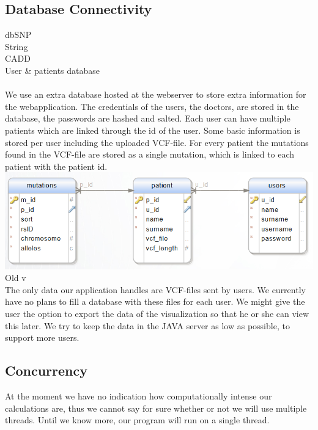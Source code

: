 	\subsection{Database Connectivity}
		dbSNP\\
		String\\
		CADD\\
		User \& patients database\\\\
		We use an extra database hosted at the webserver to store extra information for the webapplication. 
		The credentials of the users, the doctors, are stored in the database, the passwords are hashed and salted.
		Each user can have multiple patients which are linked through the id of the user.
		Some basic information is stored per user including the uploaded VCF-file.
		For every patient the mutations found in the VCF-file are stored as a single mutation, which is linked to each patient with the patient id.
		\includegraphics[scale=0.5]{erd.png}
		Old v\\
		The only data our application handles are VCF-files sent by users. We currently have no plans to fill a database with these files for each user. We might give the user the option to export the data of the visualization so that he or she can view this later. We try to keep the data in the JAVA server as low as possible, to support more users.
	\subsection{Concurrency }
		At the moment we have no indication how computationally intense our calculations are, thus we cannot say for sure whether or not we will use multiple threads. Until we know more, our program will run on a single thread.
		
